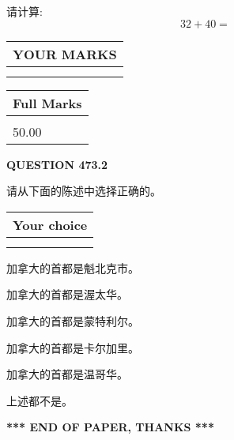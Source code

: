 \documentclass{ctexart}
\begin{document}
  
 
请计算:
\begin{equation}
32 +  %
40 = \nonumber
\end{equation}
 

 

 
  
\vspace{0.2in}
  
\noindent\begin{tabular}{|l|}
\hline
 YOUR MARKS  \\
\hline
 \\ 
 \\ 
\hline
\end{tabular}
\hspace{0.05in} \begin{tabular}{|l|}
\hline
 Full Marks  \\
\hline
 \\ 
50.00 \\
\hline
\end{tabular}
{\textbf{\Large{QUESTION
473.2 
}}}
  
  
请从下面的陈述中选择正确的。
  
  
\noindent\hspace{3.0in} \begin{tabular}{|l|}
\hline
Your choice \\
\hline
 \\ 
 \\ 
\hline
\end{tabular}
  
  
 
 
加拿大的首都是魁北克市。
 
 
加拿大的首都是渥太华。
 
 
加拿大的首都是蒙特利尔。
 
 
加拿大的首都是卡尔加里。
 
 
加拿大的首都是温哥华。
 
 
 上述都不是。
 
 
   
   
 \vspace{0.2in}
 
   
   
   
   
\vspace{1.0in} 
{\textbf{\large{ *** END OF PAPER, THANKS *** }}} 
   
\end{document}
